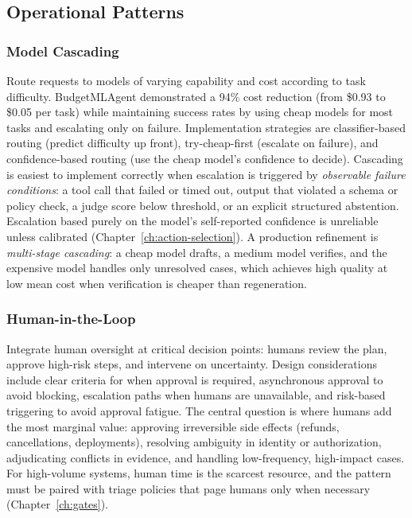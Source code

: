 \documentclass[11pt]{book}
\begin{document}
\subsection{Operational Patterns}

\subsubsection{Model Cascading}

Route requests to models of varying capability and cost according to task difficulty. BudgetMLAgent \cite{budgetmlagent2024} demonstrated a 94\% cost reduction (from \$0.93 to \$0.05 per task) while maintaining success rates by using cheap models for most tasks and escalating only on failure. Implementation strategies are classifier-based routing (predict difficulty up front), try-cheap-first (escalate on failure), and confidence-based routing (use the cheap model's confidence to decide). Cascading is easiest to implement correctly when escalation is triggered by \textit{observable failure conditions}: a tool call that failed or timed out, output that violated a schema or policy check, a judge score below threshold, or an explicit structured abstention. Escalation based purely on the model's self-reported confidence is unreliable unless calibrated (Chapter~\ref{ch:action-selection}). A production refinement is \textit{multi-stage cascading}: a cheap model drafts, a medium model verifies, and the expensive model handles only unresolved cases, which achieves high quality at low mean cost when verification is cheaper than regeneration.

\subsubsection{Human-in-the-Loop}

Integrate human oversight at critical decision points: humans review the plan, approve high-risk steps, and intervene on uncertainty. Design considerations include clear criteria for when approval is required, asynchronous approval to avoid blocking, escalation paths when humans are unavailable, and risk-based triggering to avoid approval fatigue. The central question is where humans add the most marginal value: approving irreversible side effects (refunds, cancellations, deployments), resolving ambiguity in identity or authorization, adjudicating conflicts in evidence, and handling low-frequency, high-impact cases. For high-volume systems, human time is the scarcest resource, and the pattern must be paired with triage policies that page humans only when necessary (Chapter~\ref{ch:gates}).
\end{document}
